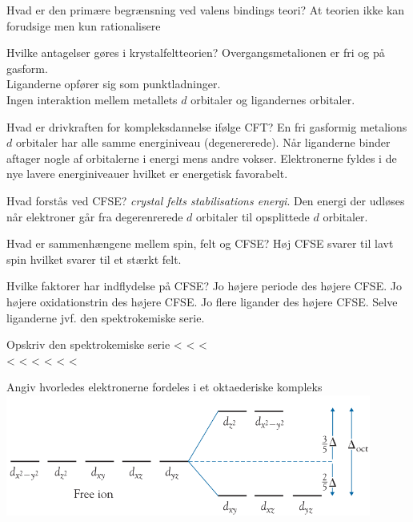 \begin{flashcard}[Teori]{Hvad er den primære begrænsning ved valens bindings teori?}
At teorien ikke kan forudsige men kun rationalisere
\end{flashcard}


\begin{flashcard}[Teori]{Hvilke antagelser gøres i krystalfeltteorien?}
Overgangsmetalionen er fri og på gasform.\\
Liganderne opfører sig som punktladninger.\\
Ingen interaktion mellem metallets $d$ orbitaler og ligandernes orbitaler.
\end{flashcard}


\begin{flashcard}[Teori]{Hvad er drivkraften for kompleksdannelse ifølge CFT?}
En fri gasformig metalions $d$ orbitaler har alle samme energiniveau (degenererede). Når liganderne binder aftager nogle af orbitalerne i energi mens andre vokser. Elektronerne fyldes i de nye lavere energiniveauer hvilket er energetisk favorabelt.
\end{flashcard}


\begin{flashcard}[Teori]{Hvad forstås ved CFSE?}
\textit{crystal felts stabilisations energi}. Den energi der udløses når elektroner går fra degerenrerede $d$ orbitaler til opsplittede $d$ orbitaler.
\end{flashcard}


\begin{flashcard}[Teori]{Hvad er sammenhængene mellem spin, felt og CFSE?}
Høj CFSE svarer til lavt spin hvilket svarer til et stærkt felt.
\end{flashcard}


\begin{flashcard}[Teori]{Hvilke faktorer har indflydelse på CFSE?}
Jo højere periode des højere CFSE.
Jo højere oxidationstrin des højere CFSE.
Jo flere ligander des højere CFSE.
Selve liganderne jvf. den spektrokemiske serie.
\end{flashcard}


\begin{flashcard}[Teori]{Opskriv den spektrokemiske serie}
 <  <  < \\<  <  <  <  <  < 
\end{flashcard}


\begin{flashcard}[Teori]{Angiv hvorledes elektronerne fordeles i et oktaederiske kompleks}
\includegraphics[width=0.9\textwidth]{figures/k19s513mooct.png}
\end{flashcard}


